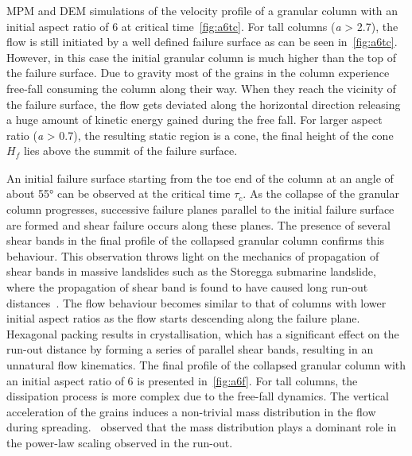 MPM and DEM simulations of the velocity profile of a granular column with an 
initial aspect ratio of 6 at critical time~\cref{fig:a6tc}. For tall columns 
(\textit{a} > 2.7), the flow is still initiated by a well defined failure 
surface as can be seen in~\cref{fig:a6tc}. However, in this case the 
initial granular column is much higher than the top of the failure surface. Due 
to gravity most of the grains in the column experience free-fall 
consuming the column along their way. When they reach the vicinity of the 
failure surface, the flow gets deviated along the horizontal direction 
releasing a huge amount of kinetic energy gained during the free fall. For 
larger aspect ratio (\textit{a} > 0.7), the resulting static region is a cone, 
the final height of the cone $\textit{H}_{\textit{f}}$ lies above the 
summit of the failure surface. 

An initial failure surface starting from the toe end 
of the column at an angle of about 55$\si{\degree}$ can be observed at the 
critical time $\tau_{c}$. As the collapse of the granular column progresses, 
successive failure planes parallel to the initial failure surface are formed 
and shear failure occurs along these planes. The presence of several shear 
bands in the final profile of the collapsed granular column confirms this 
behaviour. This observation throws light on the mechanics of propagation of 
shear bands in massive landslides such as the 
Storegga submarine landslide, where the propagation of shear band is found to 
have caused long run-out distances~\citep{Dey2012}. The flow behaviour becomes 
similar to that 
of 
columns with lower initial aspect ratios as the flow starts descending along 
the failure plane. Hexagonal packing results in crystallisation, which has a 
significant effect on the run-out distance by forming a series of parallel 
shear bands, resulting in an unnatural flow kinematics. The final profile of 
the collapsed granular column with an initial aspect ratio of 6 is presented 
in~\cref{fig:a6f}. For tall columns, the dissipation process is more complex 
due to the free-fall dynamics. The vertical acceleration of the grains induces 
a non-trivial mass distribution in the flow during 
spreading.~\citet{Staron2007a} observed that the mass distribution plays 
a dominant role in the power-law scaling observed in the run-out.


